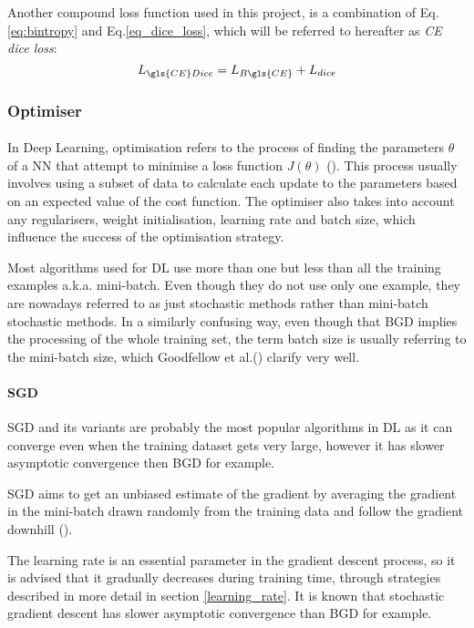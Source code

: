 Another compound loss function used in this project, is a combination of Eq.\ref{eq:bintropy} and Eq.\ref{eq_dice_loss}, which will be referred to hereafter as \textit{\gls{CE} dice loss}:
\begin{equation}
L_{\gls{CE} Dice} = L_{B\gls{CE}} + L_{dice}
\end{equation}
\subsubsection{Optimiser} \label{optimiser}
\paragraph{}
In Deep Learning, optimisation refers to the process of finding the parameters $\theta$ of a \gls{NN} that attempt to minimise a loss function $J(\theta)$ (\cite{GoodBengCour16}). This process usually involves using a subset of data to calculate each update to the parameters based on an expected value of the cost function. The optimiser also takes into account any regularisers, weight initialisation, learning rate and batch size, which influence the success of the optimisation strategy.

Most algorithms used for \gls{DL} use more than one but less than all the training examples \gls{a.k.a.} mini-batch. Even though they do not use only one example, they are nowadays referred to as just stochastic methods rather than mini-batch stochastic methods. In a similarly confusing way, even though that \gls{BGD} implies the processing of the whole training set, the term batch size is usually referring to the mini-batch size, which Goodfellow et al.(\cite{GoodBengCour16}) clarify very well.
\paragraph{\gls{SGD}}
\gls{SGD} and its variants are probably the most popular algorithms in \gls{DL} as it can converge even when the training dataset gets very large, however it has slower asymptotic convergence then \gls{BGD} for example.

\gls{SGD} aims to get an unbiased estimate of the gradient by averaging the gradient in the mini-batch drawn randomly from the training data and follow the gradient downhill (\cite{GoodBengCour16}).

The learning rate is an essential parameter in the gradient descent process, so it is advised that it gradually decreases during training time, through strategies described in more detail in section \ref{learning_rate}. It is known that stochastic gradient descent has slower asymptotic convergence than \gls{BGD} for example.

